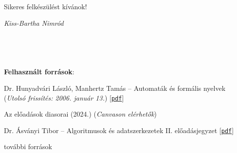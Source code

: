 \documentclass[a4paper,11pt]{book}
\begin{document}
Sikeres felkészülést kívánok!


\begin{flushright}
	\textit{Kiss-Bartha Nimród}
\end{flushright}

\begin{center}
	~
	
	~
\end{center}

\textbf{Felhasznált források}:
\begin{enumerate}[{[}1.{]}]
	\item Dr. Hunyadvári László, Manhertz Tamás -- Automaták és formális nyelvek \\ (\textit{Utolsó frissítés: 2006. január 13.}) [\href{http://aszt.inf.elte.hu/~hunlaci/book.pdf}{\texttt{pdf}}]
	\item Az előadások diasorai (2024.) (\textit{Canvason elérhetők})
	\item Dr. Ásványi Tibor -- Algoritmusok és adatszerkezetek II. előadásjegyzet [\href{http://aszt.inf.elte.hu/~asvanyi/ad/ad2jegyzet/}{\texttt{pdf}}]
	\item további források
\end{enumerate}

\mainmatter











%
%

\backmatter
\end{document}
